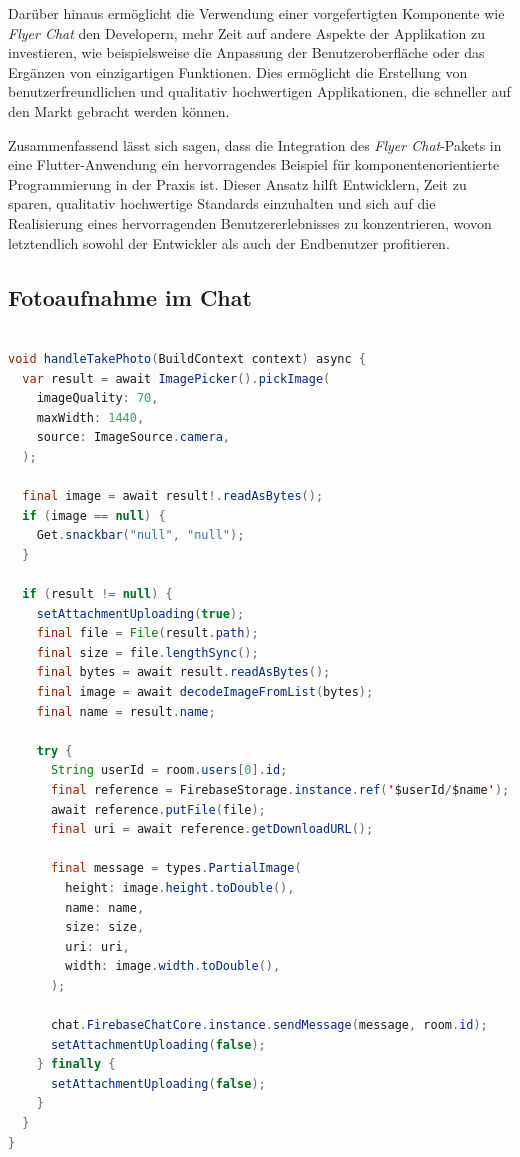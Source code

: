 Darüber hinaus ermöglicht die Verwendung einer vorgefertigten Komponente wie \textit{Flyer Chat} den Developern, mehr Zeit auf andere Aspekte der Applikation zu investieren, wie beispielsweise die Anpassung der Benutzeroberfläche oder das Ergänzen von einzigartigen Funktionen. Dies ermöglicht die Erstellung von benutzerfreundlichen und qualitativ hochwertigen Applikationen, die schneller auf den Markt gebracht werden können.

Zusammenfassend lässt sich sagen, dass die Integration des \textit{Flyer Chat}-Pakets in eine Flutter-Anwendung ein hervorragendes Beispiel für komponentenorientierte Programmierung in der Praxis ist. Dieser Ansatz hilft Entwicklern, Zeit zu sparen, qualitativ hochwertige Standards einzuhalten und sich auf die Realisierung eines hervorragenden Benutzererlebnisses zu konzentrieren, wovon letztendlich sowohl der Entwickler als auch der Endbenutzer profitieren.

\subsection{Fotoaufnahme im Chat}

\begin{lstlisting}[language=Java,caption=Aufnahmeprozess für ein Foto,label=lst:foto]  

void handleTakePhoto(BuildContext context) async {
  var result = await ImagePicker().pickImage(
    imageQuality: 70,
    maxWidth: 1440,
    source: ImageSource.camera,
  );

  final image = await result!.readAsBytes();
  if (image == null) {
    Get.snackbar("null", "null");
  }

  if (result != null) {
    setAttachmentUploading(true);
    final file = File(result.path);
    final size = file.lengthSync();
    final bytes = await result.readAsBytes();
    final image = await decodeImageFromList(bytes);
    final name = result.name;

    try {
      String userId = room.users[0].id;
      final reference = FirebaseStorage.instance.ref('$userId/$name');
      await reference.putFile(file);
      final uri = await reference.getDownloadURL();

      final message = types.PartialImage(
        height: image.height.toDouble(),
        name: name,
        size: size,
        uri: uri,
        width: image.width.toDouble(),
      );

      chat.FirebaseChatCore.instance.sendMessage(message, room.id);
      setAttachmentUploading(false);
    } finally {
      setAttachmentUploading(false);
    }
  }
}

\end{lstlisting}

